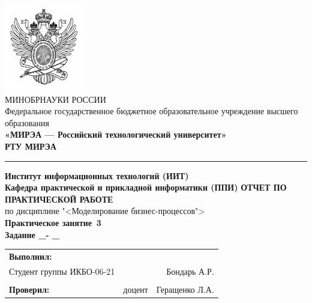 \begin{titlepage}
	
	\thispagestyle{fancy}
	\renewcommand{\headrulewidth}{0pt}
	\setlength{\headheight}{17.0pt}

	\begin{center}
		\includegraphics[scale=0.5]{./res/logo}\\ %
		МИНОБРНАУКИ РОССИИ\\
		Федеральное государственное бюджетное образовательное
		учреждение высшего образования\\
		\textbf{«МИРЭА --- Российский технологический университет»}\\
		\textbf{\large РТУ МИРЭА}\\
		\bigskip \hrule \smallskip
		\textbf{
			Институт информационных технологий (ИИТ)\\
			Кафедра практической и прикладной информатики (ППИ)
		}
		\vfill
		\textbf{\large ОТЧЕТ ПО ПРАКТИЧЕСКОЙ РАБОТЕ}\\
		по дисциплине "<Моделирование бизнес-процессов">\\
		\vfill
		\textbf{
			Практическое занятие \No\,3\\
			Задание \No\_- \No\_
		}
		\vfill
		\vfill
		\begin{tabular}{lrr}
			\textbf{Выполнил:} & &\\
			Студент группы ИКБО-06-21 & & Бондарь А.Р. \\\\
			\textbf{Проверил:} &  доцент & Геращенко Л.А. \\
		\end{tabular}
		\vfill
	\end{center}
\end{titlepage}
\setcounter{page}{2}
\clearpage

